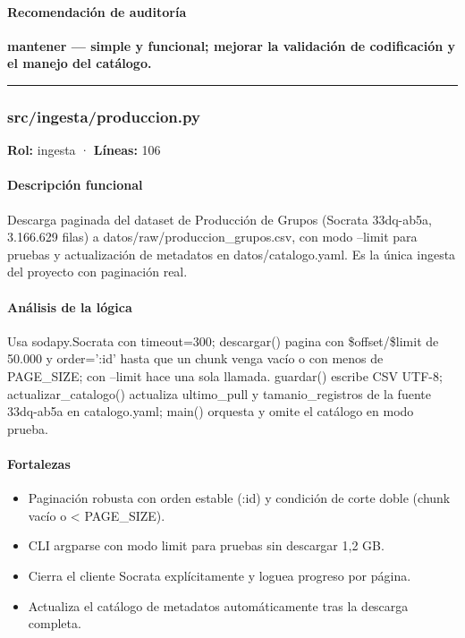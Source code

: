 \paragraph{Recomendación de auditoría}
\textbf{mantener --- simple y funcional; mejorar la validación de codificación y el manejo del catálogo.}

\medskip
\hrule

\subsubsection{src/ingesta/produccion.py}
\textbf{Rol:} ingesta · \textbf{Líneas:} 106

\paragraph{Descripción funcional}
Descarga paginada del dataset de Producción de Grupos (Socrata 33dq-ab5a, 3.166.629 filas) a datos/raw/produccion\_grupos.csv, con modo --limit para pruebas y actualización de metadatos en datos/catalogo.yaml. Es la única ingesta del proyecto con paginación real.

\paragraph{Análisis de la lógica}
Usa sodapy.Socrata con timeout=300; descargar() pagina con \$offset/\$limit de 50.000 y order=':id' hasta que un chunk venga vacío o con menos de PAGE\_SIZE; con --limit hace una sola llamada. guardar() escribe CSV UTF-8; actualizar\_catalogo() actualiza ultimo\_pull y tamanio\_registros de la fuente 33dq-ab5a en catalogo.yaml; main() orquesta y omite el catálogo en modo prueba.

\paragraph{Fortalezas}
\begin{itemize}
  \item Paginación robusta con orden estable (:id) y condición de corte doble (chunk vacío o < PAGE\_SIZE).
  \item CLI argparse con modo limit para pruebas sin descargar 1,2 GB.
  \item Cierra el cliente Socrata explícitamente y loguea progreso por página.
  \item Actualiza el catálogo de metadatos automáticamente tras la descarga completa.
\end{itemize}

